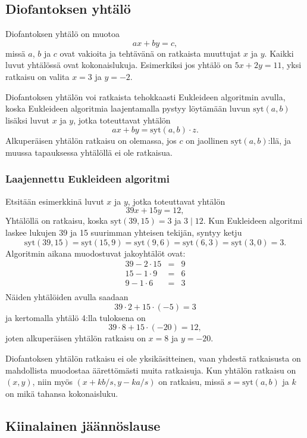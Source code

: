 \subsection{Diofantoksen yhtälö}

Diofantoksen yhtälö on muotoa
\[ ax + by = c, \]
missä $a$, $b$ ja $c$ ovat vakioita
ja tehtävänä on ratkaista muuttujat $x$ ja $y$.
Kaikki luvut yhtälössä ovat kokonaislukuja.
Esimerkiksi jos yhtälö on $5x+2y=11$, yksi ratkaisu
on valita $x=3$ ja $y=-2$.

Diofantoksen yhtälön voi ratkaista
tehokkaasti Eukleideen algoritmin avulla,
koska Eukleideen algoritmia laajentamalla
pystyy löytämään luvun $\textrm{syt}(a,b)$
lisäksi luvut $x$ ja $y$,
jotka toteuttavat yhtälön
\[
ax + by = \textrm{syt}(a,b) \cdot z.
\]
Alkuperäisen yhtälön ratkaisu on olemassa, jos $c$ on
jaollinen $\textrm{syt}(a,b)$:llä,
ja muussa tapauksessa yhtälöllä ei ole ratkaisua.

\subsubsection*{Laajennettu Eukleideen algoritmi}

Etsitään esimerkkinä luvut $x$ ja $y$,
jotka toteuttavat yhtälön
\[
39x + 15y = 12,
\]
Yhtälöllä on ratkaisu, koska $\textrm{syt}(39,15)=3$
ja $3 \mid 12$.
Kun Eukleideen algoritmi laskee lukujen
39 ja 15 suurimman
yhteisen tekijän, syntyy ketju
\[
\textrm{syt}(39,15) = \textrm{syt}(15,9)
= \textrm{syt}(9,6) = \textrm{syt}(6,3)
= \textrm{syt}(3,0) = 3. \]
Algoritmin aikana muodostuvat jakoyhtälöt ovat:
\[
\begin{array}{lcl}
39 - 2 \cdot 15 & = & 9 \\
15 - 1 \cdot 9 & = & 6 \\
9 - 1 \cdot 6 & = & 3 \\
\end{array}
\]
Näiden yhtälöiden avulla saadaan
\[
39 \cdot 2 + 15 \cdot (-5) = 3
\]
ja kertomalla yhtälö 4:lla tuloksena on
\[
39 \cdot 8 + 15 \cdot (-20) = 12,
\]
joten alkuperäisen yhtälön ratkaisu on $x=8$ ja $y=-20$.

Diofantoksen yhtälön ratkaisu ei ole yksikäsitteinen,
vaan yhdestä ratkaisusta on mahdollista muodostaa
äärettömästi muita ratkaisuja.
Kun yhtälön ratkaisu on $(x,y)$,
niin myös $(x+k b/s,y-k a/s)$ on ratkaisu,
missä $s=\textrm{syt}(a,b)$ ja $k$
on mikä tahansa kokonaisluku.

\subsection{Kiinalainen jäännöslause}

